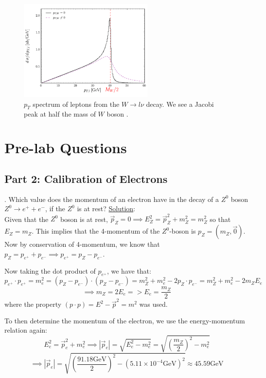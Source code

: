 \documentclass[a4paper]{report}
\numberwithin{equation}{section}
\begin{document}
\begin{figure}[htpb]
    \centering
    \includegraphics[width=0.6\textwidth]{jacobi}
    \caption{$p_T$ spectrum of leptons from the $W \rightarrow l \nu$ decay. We see a Jacobi peak at half the mass of $W$ boson \cite{jacobi}.}
    \label{fig:jacobi}
\end{figure}


\chapter{Pre-lab Questions} \label{chap:prelab}

\section{Part 2: Calibration of Electrons}

. Which value does the momentum of an electron have in the decay of a $Z^0$ boson $Z^0 \rightarrow e^+ + e^-$, if the $Z^0$ is at rest? 
\bigbreak
\noindent \underline{Solution}: \\
\noindent Given that the $Z^0$ boson is at rest, $\vec{p}_Z = 0 \implies E_Z^2 = \vec{p}_Z^2 + m_Z^2 = m_Z^2$ so that $E_Z = m_Z$. This implies that the 4-momentum of the $Z^0$-boson is $p_Z = (m_Z, \vec{0})$. 
\noindent Now by conservation of 4-momentum, we know that $p_Z = p_{e^+} + p_{e^-} \implies p_{e^+} = p_Z - p_{e^-}$. 

\noindent Now taking the dot product of $p_{e^+}$, we have that:
$$
p_{e^+} \cdot p_{e^+} = m_e^2 = (p_Z - p_{e^-}) \cdot (p_Z - p_{e^-}) = m_Z^2 + m_e^2 - 2 p_Z \cdot p_{e^-} = m_Z^2 + m_e^2 - 2m_Z E_e
$$
$$
\implies m_Z = 2E_e => E_e = \frac{m_Z}{2}
$$
\noindent where the property $(p \cdot p) = E^2 - \vec{p}^2 = m^2$ was used. 

\noindent To then determine the momentum of the electron, we use the energy-momentum relation again:
$$E_e^2 = \vec{p}_e^2 + m_e^2 \implies |\vec{p}_e| = \sqrt{E_e^2 - m_e^2} = \sqrt{\left(\frac{m_Z}{2}\right)^2- m_e^2}$$
$$\implies |\vec{p}_e| = \sqrt{\left(\frac{91.18 \text{GeV} }{2}\right)^2 - (5.11 \times 10^{-4} \text{GeV})^2} \approx 45.59 \text{GeV}$$
\end{document}
